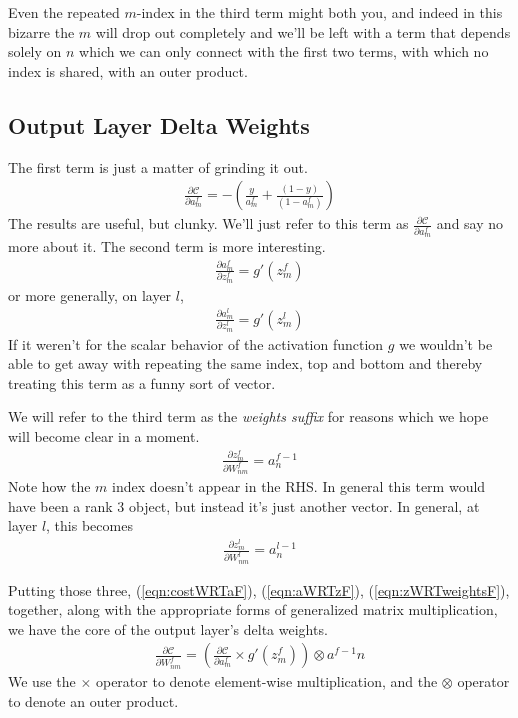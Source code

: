 \documentclass[twocolumn]{revtex4-1}
\newcommand{\cC}{\mathscr{C}}
\newcommand{\parpar}[2]{\frac{\partial #1}{\partial #2}}
\begin{document}
Even the repeated $m$-index in the third term might both you, and indeed in this bizarre the $m$ will drop out completely and we'll be left with a term that depends solely on $n$ which we can only connect with the first two terms, with which no index is shared, with an outer product.


\subsection{Output Layer Delta Weights}
The first term is just a matter of grinding it out.
\begin{align}
    \label{eqn:costWRTaF}
    \parpar{\cC}{a^f_m} = - \left(\frac{y}{a^f_m} + \frac{(1 - y)}{(1 - a^f_m)}\right)
\end{align}
The results are useful, but clunky. We'll just refer to this term as $\parpar{\cC}{a^f_m}$ and say no more about it. The second term is more interesting.
\begin{align}
    \label{eqn:aWRTzF}
    \parpar{a^f_m}{z^f_m} = g'(z^f_m)
\end{align}
or more generally, on layer $l$,
\begin{align}
    \label{eqn:aWRTzL}
    \parpar{a^l_m}{z^l_m} = g'(z^l_m)
\end{align}
If it weren't for the scalar behavior of the activation function $g$ we wouldn't be able to get away with repeating the same index, top and bottom and thereby treating this term as a funny sort of vector.

We will refer to the third term as the \textit{weights suffix} for reasons which we hope will become clear in a moment.
\begin{align}
    \label{eqn:zWRTweightsF}
    \parpar{z^f_m}{W^f_{n m}} = a^{f-1}_n
\end{align}
Note how the $m$ index doesn't appear in the RHS. In general this term would have been a rank 3 object, but instead it's just another vector. In general, at layer $l$, this becomes
\begin{align}
    \label{eqn:zWRTweightsL}
    \parpar{z^l_m}{W^l_{n m}} = a^{l-1}_n
\end{align}

Putting those three, (\ref{eqn:costWRTaF}), (\ref{eqn:aWRTzF}), (\ref{eqn:zWRTweightsF}), together, along with the appropriate forms of generalized matrix multiplication, we have the core of the output layer's delta weights.
\begin{align}
    \label{eqn:costWRTweightsF}
    \parpar{\cC}{W^f_{n m}} = \left(\parpar{\cC}{a^f_m} \times g'(z^f_m) \right) \otimes a^{f-1}{n}
\end{align}
We use the $\times$ operator to denote element-wise multiplication, and the $\otimes$ operator to denote an outer product.
\end{document}
